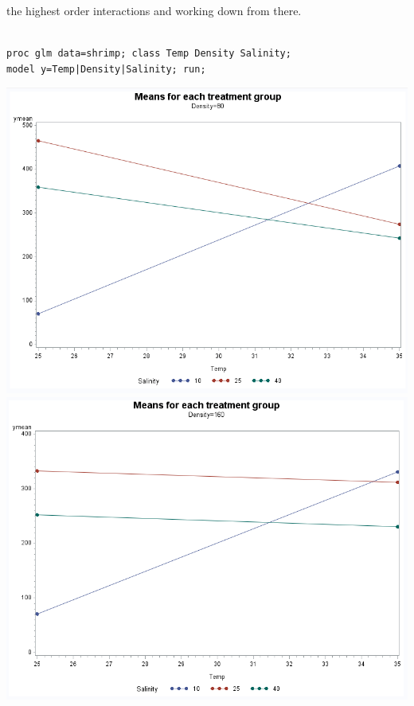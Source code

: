  the highest order interactions and working down from there.\\~\\

\begin{small}
\begin{verbatim}
proc glm data=shrimp; class Temp Density Salinity;
model y=Temp|Density|Salinity; run;
\end{verbatim}
\end{small}

\begin{center}
\includegraphics[scale=0.35]{Shrimp1}\includegraphics[scale=0.35]{Shrimp2}\\

\end{center}
